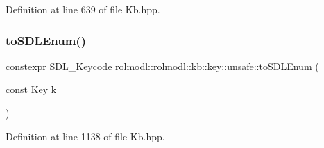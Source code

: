 Definition at line 639 of file Kb.\+hpp.

\mbox{\label{namespacerolmodl_1_1rolmodl_1_1kb_1_1key_1_1unsafe_af1a52ef3c05b841553662ec04d3daf10}} 
\subsubsection{\texorpdfstring{toSDLEnum()}{toSDLEnum()}}
{\footnotesize\ttfamily constexpr S\+D\+L\+\_\+\+Keycode rolmodl\+::rolmodl\+::kb\+::key\+::unsafe\+::to\+S\+D\+L\+Enum (\begin{DoxyParamCaption}\item[{const \mbox{\hyperlink{namespacerolmodl_1_1rolmodl_1_1kb_a188e00b289aeb95ae45fb6bf2923e7e2}{Key}}}]{k }\end{DoxyParamCaption})\hspace{0.3cm}{\ttfamily [noexcept]}}



Definition at line 1138 of file Kb.\+hpp.

